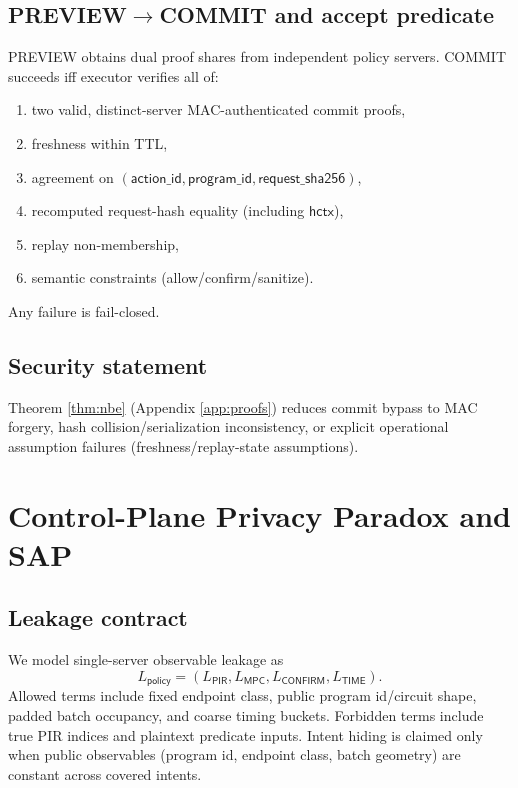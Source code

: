 \subsection{PREVIEW$\rightarrow$COMMIT and accept predicate}

PREVIEW obtains dual proof shares from independent policy servers.
COMMIT succeeds iff executor verifies all of:
\begin{enumerate}
  \item two valid, distinct-server MAC-authenticated commit proofs,
  \item freshness within TTL,
  \item agreement on $(\mathsf{action\_id},\mathsf{program\_id},\mathsf{request\_sha256})$,
  \item recomputed request-hash equality (including $\mathsf{hctx}$),
  \item replay non-membership,
  \item semantic constraints (allow/confirm/sanitize).
\end{enumerate}
Any failure is fail-closed.

\subsection{Security statement}

Theorem \ref{thm:nbe} (Appendix \ref{app:proofs}) reduces commit bypass to MAC forgery, hash collision/serialization inconsistency, or explicit operational assumption failures (freshness/replay-state assumptions).

\section{Control-Plane Privacy Paradox and SAP}
\label{sec:sap}

\subsection{Leakage contract}

We model single-server observable leakage as
\[
L_{\mathsf{policy}}=(L_{\mathsf{PIR}},L_{\mathsf{MPC}},L_{\mathsf{CONFIRM}},L_{\mathsf{TIME}}).
\]
Allowed terms include fixed endpoint class, public program id/circuit shape, padded batch occupancy, and coarse timing buckets.
Forbidden terms include true PIR indices and plaintext predicate inputs.
Intent hiding is claimed only when public observables (program id, endpoint class, batch geometry) are constant across covered intents.

